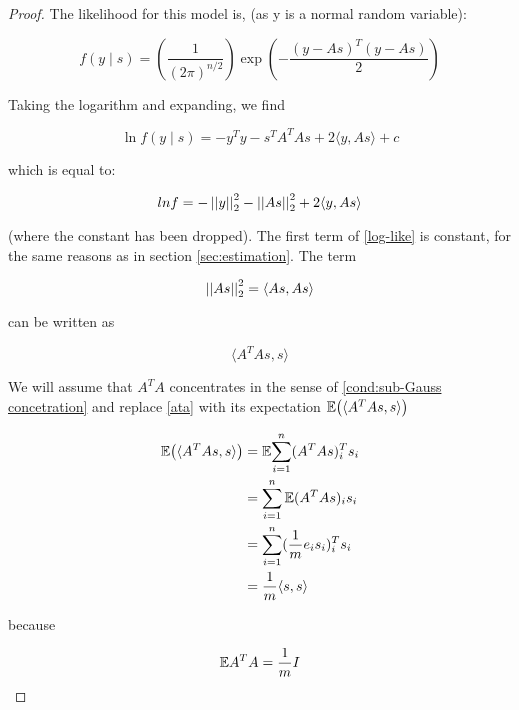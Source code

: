 \begin{proof}
The likelihood for this model is, (as y is a normal random variable):

\begin{equation}
f\left(y \mid s\right) = \left(\frac{1}{\left(2\pi\right)^{n/2}} \right)\exp{\left( - \frac{\left(y-As\right)^T  \left(y-As\right)}{2} \right)}
\end{equation}

Taking the logarithm and expanding, we find

\begin{equation}
\ln{f\left(y \mid s\right)} = -y^Ty - s^TA^TAs + 2\langle y, As \rangle + c
\end{equation}

which is equal to:

\begin{equation}
ln{f} = - \left|\left|y\right|\right|_2^2 - \left|\left|As\right|\right|_2^2 + 2\langle y, As \rangle
\label{log-like}
\end{equation}

(where the constant has been dropped). The first term of \eqref{log-like} is constant, for the same reasons as in section \eqref{sec:estimation}. The term 

\begin{equation}
\left|\left|As\right|\right|^2_2 = \langle As, As\rangle
\end{equation}

can be written as 

\begin{equation}
\langle A^T As, s\rangle
\label{ata}
\end{equation}

We will assume that \(A^TA\) concentrates in the sense of \ref{cond:sub-Gauss concetration} and replace \ref{ata} with its expectation \({\mathbb{E}}{\left( \langle A^T As, s\rangle \right)}\)

\begin{align*}
{\mathbb{E}}{\left(\langle A^T As, s\rangle\right)} &=  {\mathbb{E}}{\sum_{i=1}^n (A^TAs)^T_i s_i} \\
&= \sum_{i=1}^n {\mathbb{E}}{(A^TAs)_i s_i} \\
&= \sum_{i=1}^n (\frac{1}{m}e_i s_i)^T_i s_i \\
&= \frac{1}{m} \langle s, s \rangle
\end{align*}

because

\begin{equation}
{\mathbb{E}}{A^TA} = \frac{1}{m}I
\end{equation}


\end{proof}
